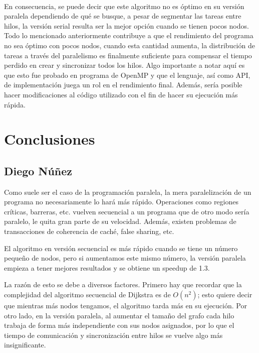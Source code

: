 \documentclass[11pt]{article}
\begin{document}
\paragraph{}
En consecuencia, se puede decir que este algoritmo no es óptimo en su versión paralela dependiendo de qué se busque, a pesar de segmentar las tareas entre hilos, la versión serial resulta ser la mejor opción cuando se tienen pocos nodos. Todo lo mencionado anteriormente contribuye a que el rendimiento del programa no sea óptimo con pocos nodos, cuando esta cantidad aumenta, la distribución de tareas a través del paralelismo es finalmente suficiente para compensar el tiempo perdido en crear y sincronizar todos los hilos. Algo importante a notar aquí es que esto fue probado en programa de OpenMP y que el lenguaje, así como API, de implementación juega un rol en el rendimiento final. Además, sería posible hacer modificaciones al código utilizado con el fin de hacer su ejecución más rápida.

\section{Conclusiones}
\subsection{Diego Núñez}
Como suele ser el caso de la programación paralela, la mera paralelización de un programa no necesariamente lo hará más rápido. Operaciones como regiones críticas, barreras, etc. vuelven secuencial a un programa que de otro modo sería paralelo, le quita gran parte de su velocidad. Además, existen problemas de transacciones de coherencia de caché, false sharing, etc.
\par
El algoritmo en versión secuencial es más rápido cuando se tiene un número pequeño de nodos, pero si aumentamos este mismo número, la versión paralela empieza a tener mejores resultados y se obtiene un speedup de 1.3.
\par
La razón de esto se debe a diversos factores. Primero hay que recordar que la complejidad del algoritmo secuencial de Dijkstra es de $O(n^2)$; esto quiere decir que mientras más nodos tengamos, el algoritmo tarda más en su ejecución. Por otro lado, en la versión paralela, al aumentar el tamaño del grafo cada hilo trabaja de forma más independiente con sus nodos asignados, por lo que el tiempo de comunicación y sincronización entre hilos se vuelve algo más insignificante. 
\end{document}
